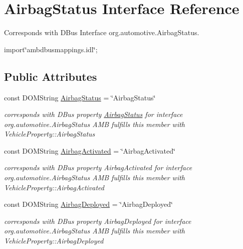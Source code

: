 \hypertarget{interfaceAirbagStatus}{\section{Airbag\+Status Interface Reference}
\label{interfaceAirbagStatus}
}


Corresponds with D\+Bus Interface org.\+automotive.\+Airbag\+Status.  




{\ttfamily import\char`\"{}ambdbusmappings.\+idl\char`\"{};}

\subsection*{Public Attributes}
\begin{DoxyCompactItemize}
\item 
\hypertarget{interfaceAirbagStatus_abb2e5adf5994835739f37101ad7388a0}{const D\+O\+M\+String \hyperlink{interfaceAirbagStatus_abb2e5adf5994835739f37101ad7388a0}{Airbag\+Status} = \char`\"{}Airbag\+Status\char`\"{}}\label{interfaceAirbagStatus_abb2e5adf5994835739f37101ad7388a0}

\begin{DoxyCompactList}\small\item\em corresponds with D\+Bus property \hyperlink{interfaceAirbagStatus}{Airbag\+Status} for interface org.\+automotive.\+Airbag\+Status A\+M\+B fulfills this member with Vehicle\+Property\+::\+Airbag\+Status \end{DoxyCompactList}\item 
\hypertarget{interfaceAirbagStatus_a63769183e7384e723b358a56818e1b81}{const D\+O\+M\+String \hyperlink{interfaceAirbagStatus_a63769183e7384e723b358a56818e1b81}{Airbag\+Activated} = \char`\"{}Airbag\+Activated\char`\"{}}\label{interfaceAirbagStatus_a63769183e7384e723b358a56818e1b81}

\begin{DoxyCompactList}\small\item\em corresponds with D\+Bus property Airbag\+Activated for interface org.\+automotive.\+Airbag\+Status A\+M\+B fulfills this member with Vehicle\+Property\+::\+Airbag\+Activated \end{DoxyCompactList}\item 
\hypertarget{interfaceAirbagStatus_ae5fea197fb5de4ec5c23d5c252f0c5ce}{const D\+O\+M\+String \hyperlink{interfaceAirbagStatus_ae5fea197fb5de4ec5c23d5c252f0c5ce}{Airbag\+Deployed} = \char`\"{}Airbag\+Deployed\char`\"{}}\label{interfaceAirbagStatus_ae5fea197fb5de4ec5c23d5c252f0c5ce}

\begin{DoxyCompactList}\small\item\em corresponds with D\+Bus property Airbag\+Deployed for interface org.\+automotive.\+Airbag\+Status A\+M\+B fulfills this member with Vehicle\+Property\+::\+Airbag\+Deployed \end{DoxyCompactList}\end{DoxyCompactItemize}



